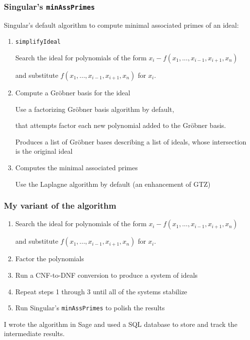 \documentclass[11pt]{beamer}
\begin{document}
\begin{frame}
\frametitle{Singular's {\tt minAssPrimes}}
Singular's default algorithm to compute minimal associated primes of an ideal:
\begin{enumerate}
\item {\tt simplifyIdeal}

Search the ideal for polynomials of the form $x_i-f(x_1,...,x_{i-1},x_{i+1},x_n)$

and substitute $f(x_1,...,x_{i-1},x_{i+1},x_n)$ for $x_i$.

\item Compute a Gr\"obner basis for the ideal

Use a factorizing Gr\"obner basis algorithm by default,

that attempts factor each new polynomial added to the Gr\"obner basis.

Produces a list of Gr\"obner bases describing a list of ideals, whose intersection is the original ideal

\item Computes the minimal associated primes

Use the Laplagne algorithm by default (an enhancement of GTZ)
\end{enumerate}
\end{frame}

\begin{frame}
\frametitle{My variant of the algorithm}
\begin{enumerate}
\item Search the ideal for polynomials of the form $x_i-f(x_1,...,x_{i-1},x_{i+1},x_n)$

and substitute $f(x_1,...,x_{i-1},x_{i+1},x_n)$ for $x_i$.

\item Factor the polynomials

\item Run a CNF-to-DNF conversion to produce a system of ideals

\item Repeat steps 1 through 3 until all of the systems stabilize

\item Run Singular's {\tt minAssPrimes} to polish the results
\end{enumerate}

\vskip 12pt

I wrote the algorithm in Sage and used a SQL database to store and track
the intermediate results.
\end{frame}
\end{document}
